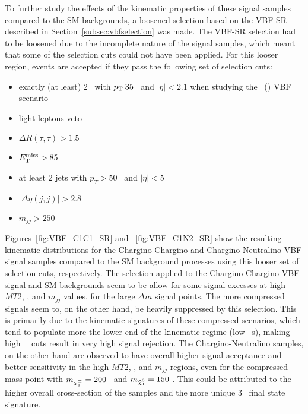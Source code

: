 	To further study the effects of the kinematic properties of these signal samples compared to the \ac{SM} backgrounds, a loosened selection based on the \ac{VBF}-\ac{SR} described in Section~\ref{subsec:vbfselection} was made. 
	The \ac{VBF}-\ac{SR} selection had to be loosened due to the incomplete nature of the signal samples, which meant that some of the selection cuts could not have been applied. 
	For this looser region, events are accepted if they pass the following set of selection cuts:
	\begin{itemize}
	\item exactly (at least) 2 \htau\ with $p_{\mathrm{T}}\>35$ \gev\ and $|\eta|<2.1$ when studying the \chinoonepm\chinoonepm\ (\chinoonepm\ninotwo) \ac{VBF} scenario
	\item light leptons veto
	\item $\Delta R (\tau,\tau)>1.5$
	\item $E_{\mathrm{T}}^{\mathrm{miss}} > 85$ \gev\
	\item at least 2 jets with $p_T>50$ \gev\ and $|\eta|<5$
	\item $|\Delta\eta(j,j)|>2.8$
	\item $m_{jj}>250$ \gev\
	\end{itemize}
	Figures~\ref{fig:VBF_C1C1_SR} and ~\ref{fig:VBF_C1N2_SR} show the resulting kinematic distributions for the Chargino-Chargino and Chargino-Neutralino \ac{VBF} signal samples compared to the \ac{SM} background processes using this looser set of selection cuts, respectively.
	The selection applied to the Chargino-Chargino \ac{VBF} signal and \ac{SM} backgrounds seem to be allow for some signal excesses at high $MT2$, \met, and $m_{jj}$ values, for the large $\Delta m$ signal points. 
	The more compressed signals seem to, on the other hand, be heavily suppressed by this selection. 
	This is primarily due to the kinematic signatures of these compressed scenarios, which tend to populate more the lower end of the kinematic regime (low \pt\ \ltau s), making high \ltau\ \pt\ cuts result in very high signal rejection.
	The Chargino-Neutralino samples, on the other hand are observed to have overall higher signal acceptance and better sensitivity in the high $MT2$, \met, and $m_{jj}$ regions, even for the compressed mass point with $m_{\chinoonepm}=200$ \gev\ and $m_{\ninoone}=150$ \gev.
	This could be attributed to the higher overall cross-section of the samples and the more unique 3 \htau\ final state signature.
	\VBFCCSR
	\VBFCNSR
	
